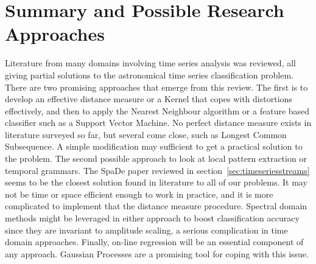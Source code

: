 	\section{Summary and Possible Research Approaches}
	Literature from many domains involving time series analysis was reviewed, all giving partial solutions to the astronomical time series classification problem. There are two promising approaches that emerge from this review. The first is to develop an effective distance measure or a Kernel that copes with distortions effectively, and then to apply the Nearest Neighbour algorithm or a feature based classifier such as a Support Vector Machine. No perfect distance measure exists in literature surveyed so far, but several come close, such as Longest Common Subsequence. A simple modification may sufficient to get a practical solution to the problem. The second possible approach to look at local pattern extraction or temporal grammars. The SpaDe paper reviewed in section~\ref{sec:timeseriesstreams} seems to be the closest solution found in literature to all of our problems. It may not be time or space efficient enough to work in practice, and it is more complicated to implement that the distance measure procedure. Spectral domain methods might be leveraged in either approach to boost classification accuracy since they are invariant to amplitude scaling, a serious complication in time domain approaches. Finally, on-line regression will be an essential component of any approach. Gaussian Processes are a promising tool for coping with this issue.
	
%	
%
